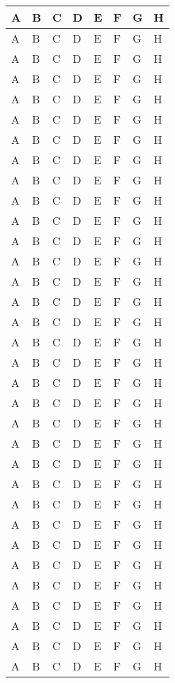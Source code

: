 \documentclass[12pt,a4paper]{article}
\begin{document}
\begin{longtable}{|p{}|p{}|p{}|p{}|p{}|p{}|p{}|p{}|}
A & B & C & D & E & F & G & H \\  \hline
A & B & C & D & E & F & G & H \\  \hline
A & B & C & D & E & F & G & H \\  \hline
A & B & C & D & E & F & G & H \\  \hline
A & B & C & D & E & F & G & H \\  \hline
A & B & C & D & E & F & G & H \\  \hline
A & B & C & D & E & F & G & H \\  \hline
A & B & C & D & E & F & G & H \\  \hline
A & B & C & D & E & F & G & H \\  \hline
A & B & C & D & E & F & G & H \\  \hline
A & B & C & D & E & F & G & H \\  \hline
A & B & C & D & E & F & G & H \\  \hline
A & B & C & D & E & F & G & H \\  \hline
A & B & C & D & E & F & G & H \\  \hline
A & B & C & D & E & F & G & H \\  \hline
A & B & C & D & E & F & G & H \\  \hline
A & B & C & D & E & F & G & H \\  \hline
A & B & C & D & E & F & G & H \\  \hline
A & B & C & D & E & F & G & H \\  \hline
A & B & C & D & E & F & G & H \\  \hline
A & B & C & D & E & F & G & H \\  \hline
A & B & C & D & E & F & G & H \\  \hline
A & B & C & D & E & F & G & H \\  \hline
A & B & C & D & E & F & G & H \\  \hline
A & B & C & D & E & F & G & H \\  \hline
A & B & C & D & E & F & G & H \\  \hline
A & B & C & D & E & F & G & H \\  \hline
A & B & C & D & E & F & G & H \\  \hline
A & B & C & D & E & F & G & H \\  \hline
A & B & C & D & E & F & G & H \\  \hline
A & B & C & D & E & F & G & H \\  \hline
A & B & C & D & E & F & G & H \\  \hline
A & B & C & D & E & F & G & H \\  \hline

\end{longtable}
\end{document}

